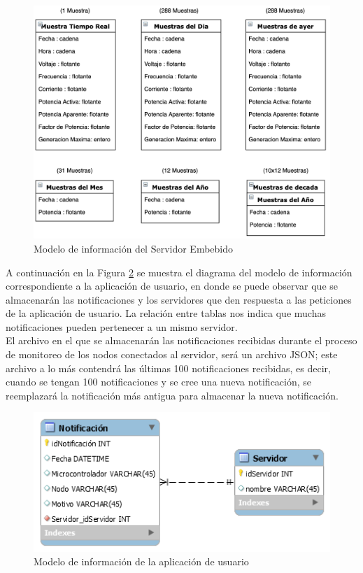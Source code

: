 \begin{figure}[H]
	\centering
	\includegraphics[scale=.30]{Capitulo4/images/Base_ServidorEmbebido.png}
	\caption{Modelo de información del Servidor Embebido}
	\label{fig:Base_ServidorEmbebido}
\end{figure}

A continuación en la Figura \ref{fig:Base_AplicacionUsuario} se muestra el diagrama del modelo de información correspondiente a la aplicación de usuario, en donde se puede observar que se almacenarán las notificaciones y los servidores que den respuesta a las peticiones de la aplicación de usuario. La relación entre tablas nos indica que muchas notificaciones pueden pertenecer a un mismo servidor.
\\
El archivo en el que se almacenarán las notificaciones recibidas durante el proceso de monitoreo de los nodos conectados al servidor, será un archivo JSON; este archivo a lo más contendrá las últimas 100 notificaciones recibidas, es decir, cuando se tengan 100 notificaciones y se cree una nueva notificación, se reemplazará la notificación más antigua para almacenar la nueva notificación. 

\begin{figure}[H]
	\centering
	\includegraphics[scale=0.8]{Capitulo4/images/Base_AplicacionUsuario.PNG}
	\caption{Modelo de información de la aplicación de usuario}
	\label{fig:Base_AplicacionUsuario}
\end{figure}